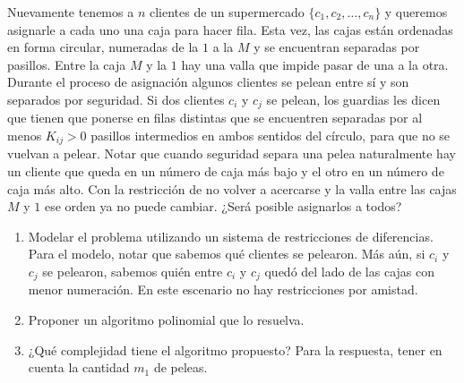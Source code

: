 
 
 \item Nuevamente tenemos a $n$ clientes de un supermercado $\{c_1, c_2, \ldots, c_n\}$ y queremos asignarle a cada uno una caja para hacer fila. Esta vez, las cajas están ordenadas en forma circular, numeradas de la $1$ a la $M$ y se encuentran separadas por pasillos. Entre la caja $M$ y la $1$ hay una valla que impide pasar de una a la otra. Durante el proceso de asignación algunos clientes se pelean entre sí y son separados por seguridad. Si dos clientes $c_i$ y $c_j$ se pelean, los guardias les dicen que tienen que ponerse en filas distintas que se encuentren separadas por al menos $K_{ij} > 0$ pasillos intermedios en ambos sentidos del círculo, para que no se vuelvan a pelear. Notar que cuando seguridad separa una pelea naturalmente hay un cliente que queda en un número de caja más bajo y el otro en un número de caja más alto. Con la restricción de no volver a acercarse y la valla entre las cajas $M$ y $1$ ese orden ya no puede cambiar. ¿Será posible asignarlos a todos?
 
 \begin{enumerate}[label=$\alph*$.,ref=$\alph*$]
  \item Modelar el problema utilizando un sistema de restricciones de diferencias.  Para el modelo, notar que sabemos qué clientes se pelearon.  Más aún, si $c_i$ y $c_j$ se pelearon, sabemos quién entre $c_i$ y $c_j$ quedó del lado de las cajas con menor numeración. En este escenario no hay restricciones por amistad.
  \item Proponer un algoritmo polinomial que lo resuelva.
  \item ¿Qué complejidad tiene el algoritmo propuesto?  Para la respuesta, tener en cuenta la cantidad $m_1$ de peleas.
 \end{enumerate}


